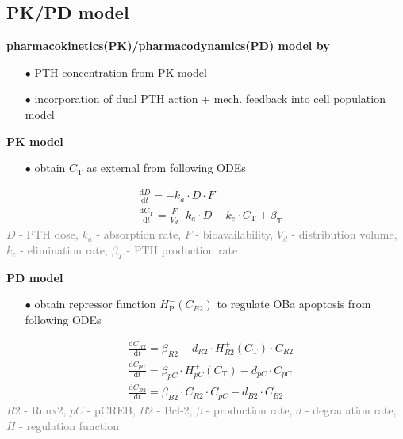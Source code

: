 \documentclass[%
aspectratio=169,  %
]{beamer}
\begin{document}
\subsection{PK/PD model}
\begin{frame}
\textbf{pharmacokinetics(PK)/pharmacodynamics(PD) model by \cite{Lavaill.2020}}
\begin{itemize}
	\item[$\bullet$] PTH concentration from PK model
	\item[$\bullet$] incorporation of dual PTH action + mech. feedback into cell population model
\end{itemize}
\textbf{PK model}
\begin{itemize}
	\item[$\bullet$] obtain $C_\text{T}$ as external  from following ODEs
\end{itemize}
\begin{subequations}
	\begin{align}
		&\frac{\text{d} D}{\text{d} t} = -k_a \cdot D \cdot F \\
		&\frac{\text{d} C_\text{T}}{\text{d} t} = \frac{F}{V_d} \cdot k_a \cdot D - k_e \cdot C_\text{T} + \beta_\text{T}
	\end{align}
\label{eq:model4-PK}
\end{subequations}
\textcolor{gray}{$D$ - PTH dose, $k_a$ - absorption rate, $F$ - bioavailability, $V_d$ - distribution volume, $k_e$ - elimination rate, $\beta_T$ - PTH production rate}
\end{frame}

\begin{frame}
\textbf{PD model}
\begin{itemize}
	\item[$\bullet$] obtain repressor function $H^{-}_\text{P}(C_{B2})$ to regulate OBa apoptosis from following ODEs
\end{itemize}
\begin{subequations}
	\begin{align}
		&\frac{\text{d} C_{R2}}{\text{d}t} = \beta_{R2} -d_{R2} \cdot H^{+}_{R2} (C_\text{T})\cdot C_{R2} \\
		&\frac{\text{d}C_{pC}}{\text{d}t} = \beta_{pC} \cdot H^{+}_{pC} (C_\text{T})  - d_{pC} \cdot C_{pC} \\ 
		&  \frac{\text{d} C_{B2}}{\text{d}t} = \beta_{B2} \cdot C_{R2} \cdot C_{pC} - d_{B2} \cdot C_{B2}
	\end{align}
\label{eq:model4-PD}
\end{subequations}
\textcolor{gray}{$R2$ - Runx2, $pC$ - pCREB, $B2$ - Bcl-2, $\beta$ - production rate, $d$ - degradation rate, $H$ - regulation function }
\end{frame}
\end{document}
